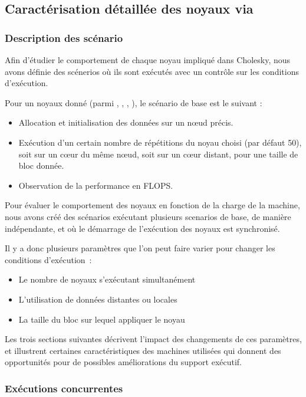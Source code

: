 \subsection{Caractérisation détaillée des noyaux via \outil}

\subsubsection{Description des scénario}

Afin d'étudier le comportement de chaque noyau impliqué dans Cholesky, nous avons définie des scénerios où ils sont exécutés avec un contrôle sur les conditions d'exécution.

Pour un noyaux donné (parmi \potrf, \trsm, \syrk, \gemm), le scénario de base est le suivant :
\begin{itemize}
  \item Allocation et initialisation des données sur un nœud précis.
  \item Exécution d'un certain nombre de répétitions du noyau choisi (par défaut 50), soit sur un cœur du même nœud, soit sur un cœur distant, pour une taille de bloc donnée.
  \item Observation de la performance en FLOPS.
\end{itemize}

Pour évaluer le comportement des noyaux en fonction de la charge de la machine, nous avons créé des scénarios exécutant plusieurs scenarios de base, de manière indépendante, et où le démarrage de l'exécution des noyaux est synchronisé.

Il y a donc plusieurs paramètres que l'on peut faire varier pour changer les conditions d'exécution~:
\begin{itemize}
  \item Le nombre de noyaux s'exécutant simultanément
  \item L'utilisation de données distantes ou locales
  \item La taille du bloc sur lequel appliquer le noyau
\end{itemize}

Les trois sections suivantes décrivent l'impact des changements de ces paramètres, et illustrent certaines caractéristiques des machines utilisées qui donnent des opportunités pour de possibles améliorations du support exécutif.

\subsubsection{Exécutions concurrentes}

